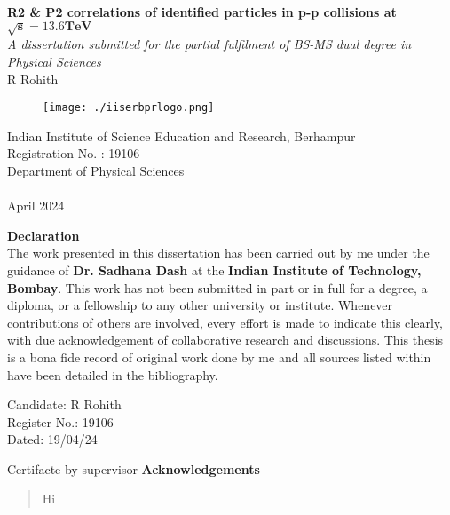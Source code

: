 \documentclass[12pt,a4paper,twoside]{report}
\newcommand{\usersetfontsize}[2]{\fontsize{#1}{#2}\selectfont}
\begin{document}
\usersetfontsize{12pt}{18pt}
\begin{titlepage}
{
	\centering
	\vspace*{2in}
	\textbf{\fontsize{16pt}{24pt}\selectfont R2 \& P2 correlations of identified particles in p-p collisions at $\mathbf{\sqrt{s}=13.6 TeV}$}%
	\\\vspace*{0.25in}
	\textit{A dissertation submitted for the partial fulfilment of BS-MS dual degree in Physical Sciences}%
	\\\vspace*{0.5in}
	{R Rohith}%
	\\\vspace*{2.8in}
	\begin{figure}[H]
		\centering
		\texttt{[image: ./iiserbprlogo.png]}
	\end{figure}
	{\usersetfontsize{14}{21}Indian Institute of Science Education and Research, Berhampur\\Registration No. : 19106\\Department of Physical Sciences\\}~\\
	{April 2024}\\
}	
\end{titlepage}
\vspace*{1in}
{\centering\Large \textbf{Declaration}\\}
\vspace*{0.5in}
The work presented in this dissertation has been carried out by me under the guidance of \textbf{Dr. Sadhana Dash} at the \textbf{Indian Institute of Technology, Bombay}. This work has not been submitted in part or in full for a degree, a diploma, or a fellowship to any other university or institute. Whenever contributions of others are involved, every effort is made to indicate this clearly, with due acknowledgement of collaborative research and discussions. This thesis is a bona fide record of original work done by me and all sources listed within have been detailed in the bibliography.
\vspace*{2.5in}
\begin{flushright}
	Candidate: R Rohith\\
	Register No.: 19106~~~\\
	Dated: 19/04/24~~~~~~~~~~
\end{flushright}
\newpage
Certifacte by supervisor
\newpage
\vspace*{1in}
{\centering\Large \textbf{Acknowledgements}\\}
\newpage
\begin{abstract}
	\thispagestyle{plain}
	\setcounter{page}{4}
	Hi
\end{abstract}
\newpage
\tableofcontents
\newpage
\listoffigures
\newpage
\listoftables
\newpage
{}
\pagestyle{headings}
\end{document}
